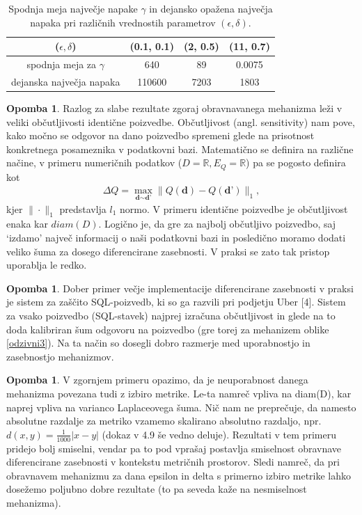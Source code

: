 \documentclass[12pt,a4paper]{amsart}
\theoremstyle{definition} %
\newtheorem{opomba}[definicija]{Opomba}
\theoremstyle{plain} %
\begin{document}
\begin{table}[h]
\begin{center}
 \begin{tabular}{| c | c | c | c |} 
 \hline
($\epsilon, \delta$) & (0.1, 0.1) & (2, 0.5) & (11, 0.7)  \\ [0.5ex] 
 \hline
 spodnja meja za $\gamma$ & 640 & 89 & 0.0075  \\ 
 \hline
 dejanska največja napaka & 110600 & 7203 & 1803\\
 \hline
\end{tabular}
\caption{Spodnja meja največje napake $\gamma$ in dejansko opažena največja napaka pri različnih vrednostih parametrov $(\epsilon, \delta)$. }
\end{center}
\end{table}
\begin{opomba}
Razlog za slabe rezultate zgoraj obravnavanega mehanizma leži v veliki občutljivosti identične poizvedbe. Občutljivost (angl. sensitivity) nam pove, kako močno se odgovor na dano poizvedbo spremeni glede na prisotnost konkretnega posameznika v podatkovni bazi. Matematično se definira na različne načine, v primeru numeričnih podatkov ($D = \mathbb{R}, E_Q = \mathbb{R}$) pa se pogosto definira kot
\begin{gather*}
\Delta Q = \max_{\textbf{d} \sim \textbf{d'}} \| Q(\textbf{d}) - Q(\textbf{d'}) \|_1 ,
\end{gather*}
kjer $\| \cdot \|_1$ predstavlja $l_1$ normo. V primeru identične poizvedbe je občutljivost enaka kar $diam(D)$. Logično je, da gre za najbolj občutljivo poizvedbo, saj `izdamo' največ informacij o naši podatkovni bazi in posledično moramo dodati veliko šuma za dosego diferencirane zasebnosti. V praksi se zato tak pristop uporablja le redko.
\end{opomba}
\begin{opomba}
Dober primer večje implementacije diferencirane zasebnosti v praksi je sistem za zaščito SQL-poizvedb, ki so ga razvili pri podjetju Uber [4]. Sistem za vsako poizvedbo (SQL-stavek) najprej izračuna občutljivost in glede na to doda kalibriran šum odgovoru na poizvedbo (gre torej za mehanizem oblike \eqref{odzivni3}). Na ta način so dosegli dobro razmerje med uporabnostjo in zasebnostjo mehanizmov.
\end{opomba}
\begin{opomba}
V zgornjem primeru opazimo, da je neuporabnost danega mehanizma povezana tudi z izbiro metrike. Le-ta namreč vpliva na diam(D), kar naprej vpliva na varianco Laplaceovega šuma. Nič nam ne preprečuje, da namesto absolutne razdalje za metriko vzamemo skalirano absolutno razdaljo, npr. $d(x,y) = \frac{1}{1000} |x - y|$ (dokaz v 4.9 še vedno deluje). Rezultati v tem primeru pridejo bolj smiselni, vendar pa to pod vprašaj postavlja smiselnost obravnave diferencirane zasebnosti v kontekstu metričnih prostorov. Sledi namreč, da pri obravnavem mehanizmu za dana epsilon in delta s primerno izbiro metrike lahko dosežemo poljubno dobre rezultate (to pa seveda kaže na nesmiselnost mehanizma).
\end{opomba}
\end{document}
